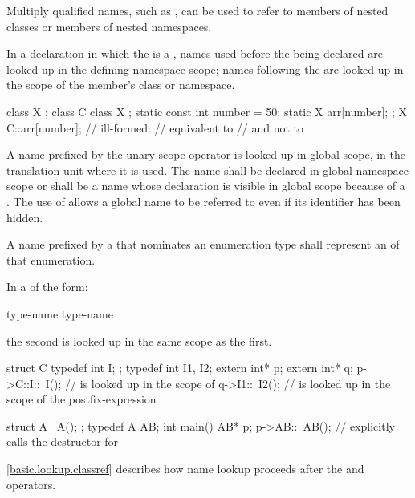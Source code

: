 \pnum
\begin{note}
Multiply qualified names, such as , can
be used to refer to members of nested classes or
members of nested namespaces.
\end{note}

\pnum
In a declaration in which the  is a
, names used before the 
being declared are looked up in the defining namespace scope; names
following the  are looked up in the scope of the
member's class or namespace.
\begin{example}
\begin{codeblock}
class X { };
class C {
  class X { };
  static const int number = 50;
  static X arr[number];
};
X C::arr[number];   // ill-formed:
                    // equivalent to  
                    // and not to  
\end{codeblock}
\end{example}

\pnum
{}%
%
A name prefixed by the unary scope operator \tcode{::}
is looked up in global scope, in the translation unit where it is used.
The name shall be declared in global namespace scope or shall be a name
whose declaration is visible in global scope because of a
. The use of \tcode{::}
allows a global name to be referred to even if its identifier has been
hidden.

\pnum
A name prefixed by a  that
nominates an enumeration type shall represent an 
of that enumeration.

\pnum
In a  of the form:

\begin{ncbnf}
 type-name \terminal{::} \terminal{\~} type-name
\end{ncbnf}
the second  is looked up in the same scope as the first.
\begin{example}
\begin{codeblock}
struct C {
  typedef int I;
};
typedef int I1, I2;
extern int* p;
extern int* q;
p->C::I::~I();      //  is looked up in the scope of 
q->I1::~I2();       //  is looked up in the scope of the postfix-expression

struct A {
  ~A();
};
typedef A AB;
int main() {
  AB* p;
  p->AB::~AB();     // explicitly calls the destructor for 
}
\end{codeblock}
\end{example}
\begin{note}
\ref{basic.lookup.classref} describes how name
lookup proceeds after the  and \tcode{->} operators.
\end{note}

